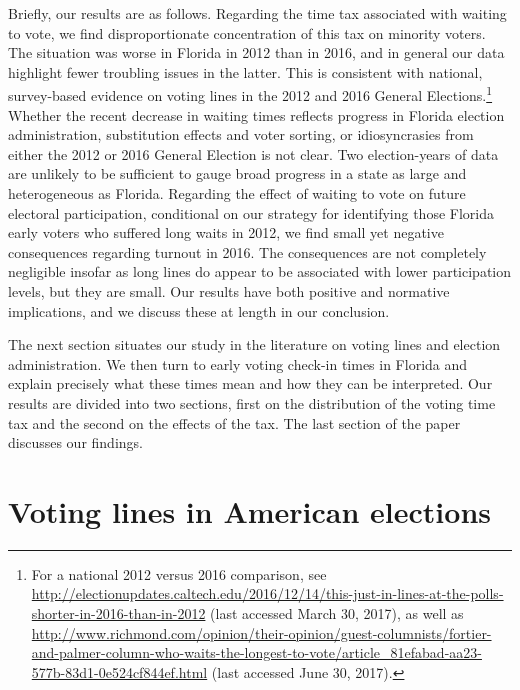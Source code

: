 \documentclass[12pt,titlepage]{article}
\begin{document}
Briefly, our results are as follows.  Regarding the time tax
associated with waiting to vote, we find disproportionate
concentration of this tax on minority voters.  The situation was worse
in Florida in 2012 than in 2016, and in general our data highlight
fewer troubling issues in the latter.  This is consistent with
national, survey-based evidence on voting lines in the 2012 and 2016
General Elections.\footnote{For a national 2012 versus 2016
  comparison, see
  \url{http://electionupdates.caltech.edu/2016/12/14/this-just-in-lines-at-the-polls-shorter-in-2016-than-in-2012}
  (last accessed March 30, 2017), as well as
  \url{http://www.richmond.com/opinion/their-opinion/guest-columnists/fortier-and-palmer-column-who-waits-the-longest-to-vote/article_81efabad-aa23-577b-83d1-0e524cf844ef.html}
  (last accessed June 30, 2017).}  Whether the recent decrease in
waiting times reflects progress in Florida election administration,
substitution effects and voter sorting, or idiosyncrasies from either
the 2012 or 2016 General Election is not clear.  Two election-years of
data are unlikely to be sufficient to gauge broad progress in a state
as large and heterogeneous as Florida.  Regarding the effect of
waiting to vote on future electoral participation, conditional on our
strategy for identifying those Florida early voters who suffered long
waits in 2012, we find small yet negative consequences regarding
turnout in 2016. The consequences are not completely negligible
insofar as long lines do appear to be associated with lower
participation levels, but they are small.  Our results have both
positive and normative implications, and we discuss these at length in
our conclusion.

The next section situates our study in the literature on voting lines
and election administration.  We then turn to early voting check-in
times in Florida and explain precisely what these times mean and how
they can be interpreted.  Our results are divided into two sections,
first on the distribution of the voting time tax and the second on the
effects of the tax.  The last section of the paper discusses our findings.

\section*{Voting lines in American elections}
\end{document}
